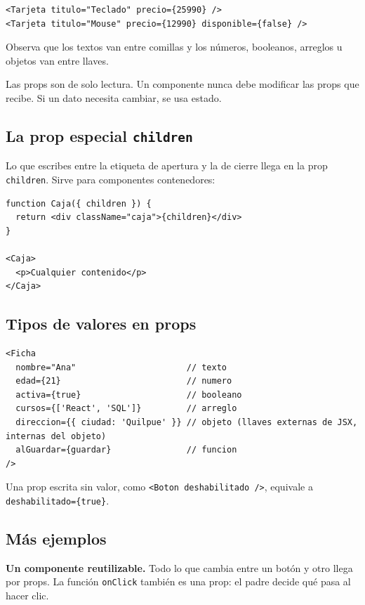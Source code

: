 \documentclass[11pt,a4paper]{article}
\newcommand{\cmd}[1]{\texttt{\color{reactdark}#1}}
\begin{document}
\begin{lstlisting}[language=JSX]
<Tarjeta titulo="Teclado" precio={25990} />
<Tarjeta titulo="Mouse" precio={12990} disponible={false} />
\end{lstlisting}

Observa que los textos van entre comillas y los números, booleanos, arreglos u objetos van entre llaves.

\begin{atencion}
Las props son de solo lectura. Un componente nunca debe modificar las props que recibe. Si un dato necesita cambiar, se usa estado.
\end{atencion}

\subsection{La prop especial \texttt{children}}

Lo que escribes entre la etiqueta de apertura y la de cierre llega en la prop \cmd{children}. Sirve para componentes contenedores:
\begin{lstlisting}[language=JSX]
function Caja({ children }) {
  return <div className="caja">{children}</div>
}

<Caja>
  <p>Cualquier contenido</p>
</Caja>
\end{lstlisting}

\subsection{Tipos de valores en props}

\begin{lstlisting}[language=JSX]
<Ficha
  nombre="Ana"                      // texto
  edad={21}                         // numero
  activa={true}                     // booleano
  cursos={['React', 'SQL']}         // arreglo
  direccion={{ ciudad: 'Quilpue' }} // objeto (llaves externas de JSX, internas del objeto)
  alGuardar={guardar}               // funcion
/>
\end{lstlisting}

Una prop escrita sin valor, como \cmd{<Boton deshabilitado />}, equivale a \cmd{deshabilitado=\{true\}}.

\subsection{Más ejemplos}

\textbf{Un componente reutilizable.} Todo lo que cambia entre un botón y otro llega por props. La función \cmd{onClick} también es una prop: el padre decide qué pasa al hacer clic.
\end{document}
